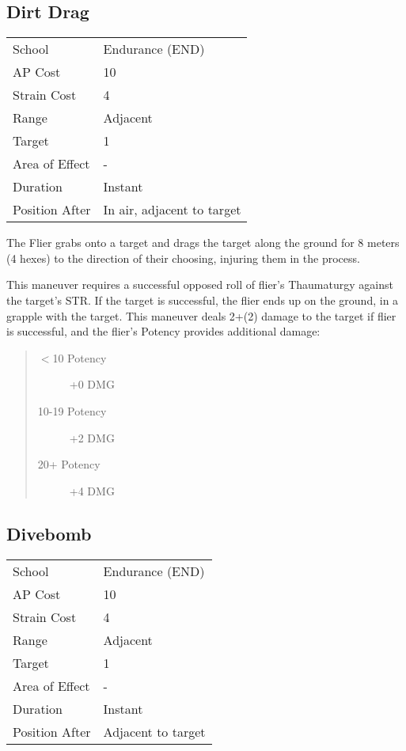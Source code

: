 \documentclass[11pt,a4paper,twocolumn]{book}
\begin{document}
\vfill




\subsection*{Dirt Drag}
{
	\begin{tabu} to 75mm{| X[l,4] | X[l,7] |}
		\hline
		School 			& Endurance (END) 	\\
		AP Cost	      	& 10 				\\
		Strain Cost     & 4 				\\
		Range     		& Adjacent 				\\
		Target      	& 1 				\\
		Area of Effect  & - 	 			\\
		Duration     	& Instant 	 		\\
		Position After  & In air, adjacent to target  			\\ \hline
	\end{tabu}
	
}

\medskip

The Flier grabs onto a target and drags the target along the ground for 8 meters (4 hexes) to the direction of their choosing, injuring them in the process. 

This maneuver requires a successful opposed roll of flier's Thaumaturgy against the target's STR. If the target is successful, the flier ends up on the ground, in a grapple with the target. This maneuver deals 2+(2) damage to the target if flier is successful, and the flier's Potency provides additional damage:

\begin{quote}
	\begin{description}
		\item[$<$10 Potency] 	+0 DMG
		\item[10-19 Potency] 	+2 DMG
		\item[20+ Potency] 	+4 DMG
	\end{description}
\end{quote}


\subsection*{Divebomb}
{
	\begin{tabu} to 75mm{| X[l,4] | X[l,7] |}
		\hline
		School 			& Endurance (END) 	\\
		AP Cost	      	& 10 				\\
		Strain Cost     & 4 				\\
		Range     		& Adjacent 				\\
		Target      	& 1 				\\
		Area of Effect  & - 	 			\\
		Duration     	& Instant 	 		\\
		Position After  & Adjacent to target 	\\ \hline
	\end{tabu}
	
}
\end{document}
